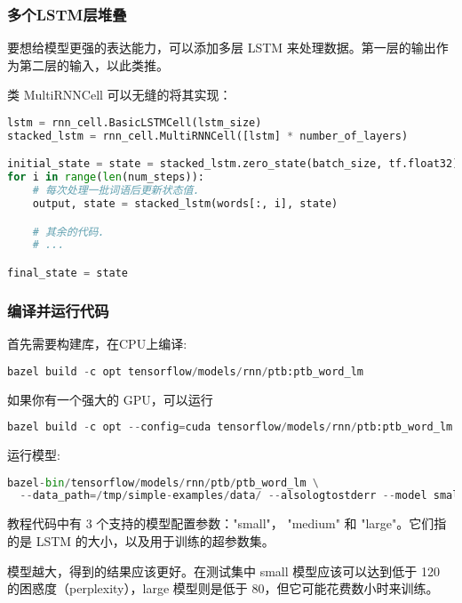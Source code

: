 \subsubsection{多个LSTM层堆叠}
要想给模型更强的表达能力，可以添加多层 LSTM 来处理数据。第一层的输出作为第二层的输入，以此类推。

类 MultiRNNCell 可以无缝的将其实现：
\begin{lstlisting}[language=Python]
lstm = rnn_cell.BasicLSTMCell(lstm_size)
stacked_lstm = rnn_cell.MultiRNNCell([lstm] * number_of_layers)

initial_state = state = stacked_lstm.zero_state(batch_size, tf.float32)
for i in range(len(num_steps)):
    # 每次处理一批词语后更新状态值.
    output, state = stacked_lstm(words[:, i], state)

    # 其余的代码.
    # ...

final_state = state
\end{lstlisting}
\subsubsection{编译并运行代码}
首先需要构建库，在CPU上编译:
\begin{lstlisting}[language=Python]
bazel build -c opt tensorflow/models/rnn/ptb:ptb_word_lm
\end{lstlisting}
如果你有一个强大的 GPU，可以运行
\begin{lstlisting}[language=Python]
bazel build -c opt --config=cuda tensorflow/models/rnn/ptb:ptb_word_lm
\end{lstlisting}
运行模型:
\begin{lstlisting}[language=Python]
bazel-bin/tensorflow/models/rnn/ptb/ptb_word_lm \
  --data_path=/tmp/simple-examples/data/ --alsologtostderr --model small
\end{lstlisting}
教程代码中有 3 个支持的模型配置参数："small"， "medium" 和 "large"。它们指的是 LSTM 的大小，以及用于训练的超参数集。

模型越大，得到的结果应该更好。在测试集中 small 模型应该可以达到低于 120 的困惑度（perplexity），large 模型则是低于 80，但它可能花费数小时来训练。

